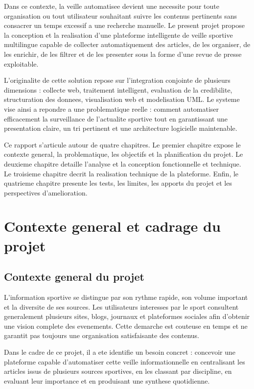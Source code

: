 \documentclass[12pt,a4paper,oneside]{report}
\begin{document}
Dans ce contexte, la veille automatisee devient une necessite pour toute organisation ou tout utilisateur souhaitant suivre les contenus pertinents sans consacrer un temps excessif a une recherche manuelle. Le present projet propose la conception et la realisation d'une plateforme intelligente de veille sportive multilingue capable de collecter automatiquement des articles, de les organiser, de les enrichir, de les filtrer et de les presenter sous la forme d'une revue de presse exploitable.

L'originalite de cette solution repose sur l'integration conjointe de plusieurs dimensions : collecte web, traitement intelligent, evaluation de la credibilite, structuration des donnees, visualisation web et modelisation UML. Le systeme vise ainsi a repondre a une problematique reelle : comment automatiser efficacement la surveillance de l'actualite sportive tout en garantissant une presentation claire, un tri pertinent et une architecture logicielle maintenable.

Ce rapport s'articule autour de quatre chapitres. Le premier chapitre expose le contexte general, la problematique, les objectifs et la planification du projet. Le deuxieme chapitre detaille l'analyse et la conception fonctionnelle et technique. Le troisieme chapitre decrit la realisation technique de la plateforme. Enfin, le quatrieme chapitre presente les tests, les limites, les apports du projet et les perspectives d'amelioration.

\chapter{Contexte general et cadrage du projet}

\section{Contexte general du projet}
L'information sportive se distingue par son rythme rapide, son volume important et la diversite de ses sources. Les utilisateurs interesses par le sport consultent generalement plusieurs sites, blogs, journaux et plateformes sociales afin d'obtenir une vision complete des evenements. Cette demarche est couteuse en temps et ne garantit pas toujours une organisation satisfaisante des contenus.

Dans le cadre de ce projet, il a ete identifie un besoin concret : concevoir une plateforme capable d'automatiser cette veille informationnelle en centralisant les articles issus de plusieurs sources sportives, en les classant par discipline, en evaluant leur importance et en produisant une synthese quotidienne.
\end{document}
